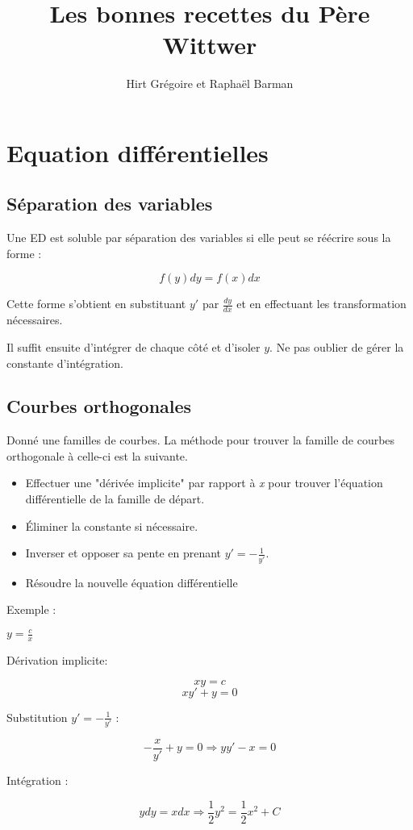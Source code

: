 \documentclass[12pt,a4paper]{report}
\author{Hirt Grégoire et Raphaël Barman}
\title{Les bonnes recettes du Père Wittwer}
\begin{document}
\maketitle

\chapter{Equation différentielles}
\section{Séparation des variables}

Une ED est soluble par séparation des variables si elle peut se réécrire sous la forme :

$$ f(y)dy = f(x)dx $$

Cette forme s'obtient en substituant $y'$ par $\frac{dy}{dx}$ et en effectuant les transformation nécessaires.

Il suffit ensuite d'intégrer de chaque côté et d'isoler $y$. Ne pas oublier de gérer la constante d'intégration.

\section{Courbes orthogonales}

Donné une familles de courbes. La méthode pour trouver la famille de courbes orthogonale à celle-ci est la suivante.

\begin{itemize}
\item Effectuer une "dérivée implicite" par rapport à \emph{x} pour trouver l'équation différentielle de la famille de départ.
\item Éliminer la constante si nécessaire.
\item Inverser et opposer sa pente en prenant $y' = -\frac{1}{y'}$.
\item Résoudre la nouvelle équation différentielle
\end{itemize}

Exemple :

$y = \frac{c}{x}$

Dérivation implicite:

$$xy = c$$
$$xy' + y = 0$$

Substitution $y' = -\frac{1}{y'}$ :

$$-\frac{x}{y'} + y = 0 \Rightarrow yy' - x = 0$$

Intégration :

$$ydy = xdx \Rightarrow \frac{1}{2}y^2 = \frac{1}{2}x^2 + C$$
\end{document}
